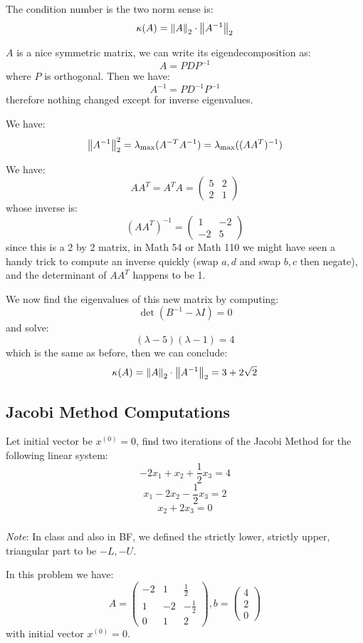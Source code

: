 \documentclass[12pt]{article} %
\newcommand{\ka}{\kappa}
\newcommand{\1}[1]{\mathds{1}\left[#1\right]}
\begin{document}
The condition number is the two norm sense is:
$$
	\ka(A) = \norm{A}_2\cdot\norm{A^{-1}}_{2}
$$

$A$ is a nice symmetric matrix, we can write its eigendecomposition as:
$$
	A = PDP^{-1}
$$ where $P$ is orthogonal. Then we have:
$$
	A^{-1} = PD^{-1}P^{-1}
$$ therefore nothing changed except for inverse eigenvalues.

We have:
$$
	\norm{A^{-1}}_2^2 = \lambda_{\max}(A^{-T}A^{-1}) = \lambda_{\max}((AA^T)^{-1})
$$

We have:
$$
	AA^T = A^TA= 
	\begin{pmatrix}
		5 & 2 \\
		2 & 1
	\end{pmatrix}
$$ whose inverse is:
$$
	(AA^T)^{-1} = 
	\begin{pmatrix}
		1 & -2 \\
		-2 & 5
	\end{pmatrix}
$$ since this is a 2 by 2 matrix, in Math 54 or Math 110 we might have seen a handy trick to compute an inverse quickly (swap $a, d$ and swap $b, c$ then negate), and the determinant of $AA^T$ happens to be 1. 

We now find the eigenvalues of this new matrix by computing:
$$
	\det(B^{-1}-\lambda I) = 0
$$ and solve:
$$
	(\lambda -5)(\lambda -1) = 4
$$ which is the same as before, then we can conclude:
$$
	\ka(A) = \norm{A}_2\cdot\norm{A^{-1}}_2 = 3+2\sqrt{2}
$$














\newpage
\subsection{Jacobi Method Computations}
Let initial vector be $x^{(0)} = 0$, find two iterations of the Jacobi Method for the following linear system:
$$
	-2x_1 + x_2 + \frac12x_3 = 4
$$
$$
	x_1 - 2x_2 - \frac12x_3 = 2
$$
$$
	x_2 + 2x_3 = 0
$$
\subsubsection{}
\emph{Note}: In class and also in BF, we defined the strictly lower, strictly upper, triangular part to be $-L, -U$.

In this problem we have:
$$
	A = 
	\begin{pmatrix}
		-2 & 1 & \frac12 \\
		1 & -2 & -\frac12 \\
		0 & 1 & 2
	\end{pmatrix},
	b = 
	\begin{pmatrix}
		4\\
		2\\
		0 
	\end{pmatrix}
$$ with initial vector $x^{(0)} = 0$.
\end{document}
